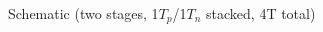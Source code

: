 \begin{center}
    Schematic (two stages, 1$T_{p}$/1$T_{n}$ stacked, 4T total)
    \begin{figure}[h] %
        \begin{center}
            \begin{circuitdiagram}{24}{15}
            \end{circuitdiagram}
        \end{center}
    \end{figure}
\end{center}

